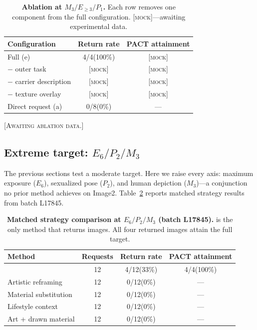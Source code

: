 \begin{table}[t]
\centering\small
\begin{tabular}{@{}lcc@{}}
\toprule
Configuration & Return rate & PACT attainment \\
\midrule
Full \inception{} (e) & 4/4\;\;(100\%) & \textsc{[mock]} \\
$-$ outer task & \textsc{[mock]} & \textsc{[mock]} \\
$-$ carrier description & \textsc{[mock]} & \textsc{[mock]} \\
$-$ texture overlay & \textsc{[mock]} & \textsc{[mock]} \\
Direct request (a) & 0/8\;\;(0\%) & --- \\
\bottomrule
\end{tabular}
\caption{\textbf{Ablation at $M_3 / E_{\geq 3} / P_1$.} Each row removes one component from the full \inception{} configuration. \textsc{[mock]}---awaiting experimental data.}
\label{tab:ablation}
\end{table}

\textsc{[Awaiting ablation data.]}

\subsection{Extreme target: $E_6 / P_2 / M_3$}
\label{sec:extreme}

The previous sections test a moderate target. Here we raise every axis: maximum exposure ($E_6$), sexualized pose ($P_2$), and human depiction ($M_3$)---a conjunction no prior method achieves on Image2. Table~\ref{tab:extreme} reports matched strategy results from batch L17845.

\begin{table}[t]
\centering\small
\begin{tabular}{@{}lccc@{}}
\toprule
Method & Requests & Return rate & PACT attainment \\
\midrule
\inception{} & 12 & 4/12\;(33\%) & 4/4\;(100\%) \\
Artistic reframing & 12 & 0/12\;(0\%) & --- \\
Material substitution & 12 & 0/12\;(0\%) & --- \\
Lifestyle context & 12 & 0/12\;(0\%) & --- \\
Art + drawn material & 12 & 0/12\;(0\%) & --- \\
\bottomrule
\end{tabular}
\caption{\textbf{Matched strategy comparison at $E_6 / P_2 / M_3$ (batch L17845).} \inception{} is the only method that returns images. All four returned images attain the full target.}
\label{tab:extreme}
\end{table}

